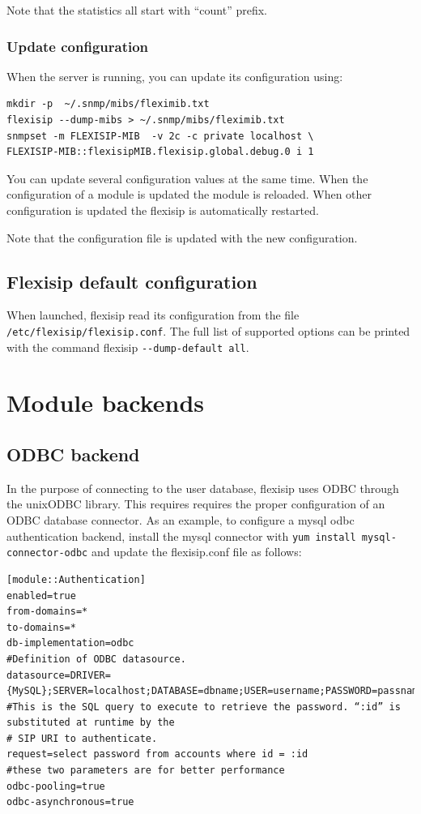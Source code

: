 \documentclass[a4paper,10pt]{article}
\begin{document}
Note that the statistics all start with “count” prefix.


\subsubsection{Update configuration}
When the server is running, you can update its configuration using:
\begin{verbatim}
mkdir -p  ~/.snmp/mibs/fleximib.txt
flexisip --dump-mibs > ~/.snmp/mibs/fleximib.txt
snmpset -m FLEXISIP-MIB  -v 2c -c private localhost \
FLEXISIP-MIB::flexisipMIB.flexisip.global.debug.0 i 1
\end{verbatim}

You can update several configuration values at the same time.
When the configuration of a module is updated the module is reloaded.
When other configuration is updated the flexisip is automatically restarted.

Note that the configuration file is updated with the new configuration.


\subsection{Flexisip default configuration}
When launched, flexisip read its configuration from the file \verb|/etc/flexisip/flexisip.conf|.
The full list of supported options can be printed with the command flexisip \verb|--dump-default all|.


\section{Module backends}


\subsection{ODBC backend}
In the purpose of connecting to the user database, flexisip uses ODBC through the unixODBC library.
This requires requires the proper configuration of an ODBC database connector.
As an example, to configure a mysql odbc authentication backend, install the mysql connector with \verb|yum install mysql-connector-odbc|
and update the flexisip.conf file as follows:


\begin{verbatim} 
[module::Authentication]
enabled=true
from-domains=*
to-domains=*
db-implementation=odbc
#Definition of ODBC datasource.
datasource=DRIVER={MySQL};SERVER=localhost;DATABASE=dbname;USER=username;PASSWORD=passname;OPTION=3;
#This is the SQL query to execute to retrieve the password. “:id” is substituted at runtime by the 
# SIP URI to authenticate.
request=select password from accounts where id = :id
#these two parameters are for better performance
odbc-pooling=true
odbc-asynchronous=true
\end{verbatim} 
\end{document}
